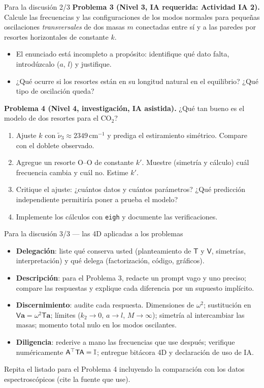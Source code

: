 \documentclass[spanish,10pt]{beamer}
\newcommand{\Tm}{\mathsf{T}}                 %
\newcommand{\Vm}{\mathsf{V}}                 %
\newcommand{\Am}{\mathsf{A}}                 %
\newcommand{\tr}{^{\top}}                    %
\newcommand{\Dele}{\textcolor{cdele}{\textbf{Delegación}}}
\newcommand{\Desc}{\textcolor{cdesc}{\textbf{Descripción}}}
\newcommand{\Disc}{\textcolor{cdisc}{\textbf{Discernimiento}}}
\newcommand{\Dili}{\textcolor{cdili}{\textbf{Diligencia}}}
\begin{document}
\begin{frame}{Para la discusión 2/3}
\small
\textbf{Problema 3 (Nivel 3, IA requerida: Actividad IA 2).} Calcule las frecuencias y las configuraciones de los modos normales para pequeñas oscilaciones \emph{transversales} de dos masas $m$ conectadas entre sí y a las paredes por resortes horizontales de constante $k$.
\begin{itemize}
  \item El enunciado está incompleto a propósito: identifique qué dato falta, introdúzcalo ($a$, $l$) y justifique.
  \item ¿Qué ocurre si los resortes están en su longitud natural en el equilibrio? ¿Qué tipo de oscilación queda?
\end{itemize}
\vspace{1ex}
\textbf{Problema 4 (Nivel 4, investigación, IA asistida).} ¿Qué tan bueno es el modelo de dos resortes para el CO$_2$?
\begin{enumerate}
  \item Ajuste $k$ con $\tilde\nu_3\approx2349\,\mathrm{cm}^{-1}$ y prediga el estiramiento simétrico. Compare con el doblete observado.
  \item Agregue un resorte O--O de constante $k'$. Muestre (simetría y cálculo) cuál frecuencia cambia y cuál no. Estime $k'$.
  \item Critique el ajuste: ¿cuántos datos y cuántos parámetros? ¿Qué predicción independiente permitiría poner a prueba el modelo?
  \item Implemente los cálculos con \texttt{eigh} y documente las verificaciones.
\end{enumerate}
\end{frame}

\begin{frame}{Para la discusión 3/3 — las 4D aplicadas a los problemas}
\begin{itemize}
  \item \Dele: liste qué conserva usted (planteamiento de $\Tm$ y $\Vm$, simetrías, interpretación) y qué delega (factorización, código, gráficos).
  \item \Desc: para el Problema 3, redacte un prompt vago y uno preciso; compare las respuestas y explique cada diferencia por un supuesto implícito.
  \item \Disc: audite cada respuesta. Dimensiones de $\omega^2$; sustitución en $\Vm\mathbf a=\omega^2\Tm\mathbf a$; límites ($k_2\to0$, $a\to l$, $M\to\infty$); simetría al intercambiar las masas; momento total nulo en los modos oscilantes.
  \item \Dili: rederive a mano las frecuencias que use después; verifique numéricamente $\Am\tr\Tm\Am=\Id$; entregue bitácora 4D y declaración de uso de IA.
\end{itemize}
\vspace{1ex}
Repita el listado para el Problema 4 incluyendo la comparación con los datos espectroscópicos (cite la fuente que use).
\end{frame}
\end{document}
